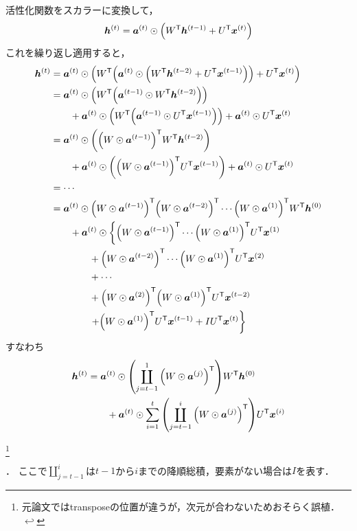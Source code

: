 \documentclass[dvipdfmx,autodetect-engine,12pt,fleqn]{jsarticle}
\newcounter{footnote-anchor}
\newcommand{\footnoteanchor}[1]{
    \hypertarget{footnote-anchor\arabic{footnote-anchor}}{}%
    \footnote{#1 \hyperlink{footnote-anchor\arabic{footnote-anchor}}{$\hookleftarrow$}}%
    \addtocounter{footnote-anchor}{1}
}
\begin{document}
活性化関数をスカラーに変換して，
\begin{equation}
\begin{split}
\bm{h}^{(t)}=\bm{a}^{(t)}\odot\qty(W^{\mathsf{T}} \bm{h}^{(t-1)} + U^{\mathsf{T}}\bm{x}^{(t)})
\end{split}
\end{equation}
これを繰り返し適用すると，
\begin{equation*}
\begin{split}
\bm{h}^{(t)}&=\bm{a}^{(t)}\odot\qty(W^{\mathsf{T}} \qty(\bm{a}^{(t)}\odot\qty(W^{\mathsf{T}} \bm{h}^{(t-2)} + U^{\mathsf{T}}\bm{x}^{(t-1)})) + U^{\mathsf{T}}\bm{x}^{(t)})\\
&=\bm{a}^{(t)}\odot\qty(W^{\mathsf{T}}\qty(\bm{a}^{(t-1)}\odot W^{\mathsf{T}}\bm{h}^{(t-2)}))\\
&\quad\quad +\bm{a}^{(t)}\odot\qty(W^{\mathsf{T}}\qty(\bm{a}^{(t-1)}\odot U^{\mathsf{T}} \bm{x}^{(t-1)}))
+\bm{a}^{(t)}\odot U^{\mathsf{T}}\bm{x}^{(t)}\\
&=\bm{a}^{(t)}\odot\qty(\qty(W \odot \bm{a}^{(t-1)})^{\mathsf{T}} W^{\mathsf{T}}\bm{h}^{(t-2)})\\
&\quad\quad +\bm{a}^{(t)}\odot\qty(\qty(W\odot\bm{a}^{(t-1)})^{\mathsf{T}} U^{\mathsf{T}} \bm{x}^{(t-1)})
+\bm{a}^{(t)}\odot U^{\mathsf{T}}\bm{x}^{(t)}\\
&=\cdots\\
&=\bm{a}^{(t)}\odot\qty(W\odot\bm{a}^{(t-1)})^{\mathsf{T}} \qty(W\odot\bm{a}^{(t-2)})^{\mathsf{T}} \cdots \qty(W\odot\bm{a}^{(1)})^{\mathsf{T}} W^{\mathsf{T}}\bm{h}^{(0)}\\
&\quad\quad+\bm{a}^{(t)}\odot\left\{\qty(W\odot\bm{a}^{(t-1)})^{\mathsf{T}} \cdots \qty(W\odot\bm{a}^{(1)})^{\mathsf{T}} U^{\mathsf{T}}\bm{x}^{(1)} \right.\\
&\quad\quad\quad\quad+\qty(W\odot\bm{a}^{(t-2)})^{\mathsf{T}} \cdots \qty(W\odot\bm{a}^{(1)})^{\mathsf{T}} U^{\mathsf{T}}\bm{x}^{(2)}\\
&\quad\quad\quad\quad+\cdots\\
&\quad\quad\quad\quad+\qty(W\odot\bm{a}^{(2)})^{\mathsf{T}}\qty(W\odot\bm{a}^{(1)})^{\mathsf{T}} U^{\mathsf{T}}\bm{x}^{(t-2)}\\
&\left.\quad\quad\quad\quad+\qty(W\odot\bm{a}^{(1)})^{\mathsf{T}} U^{\mathsf{T}}\bm{x}^{(t-1)}
+IU^{\mathsf{T}}\bm{x}^{(t)}\right\}
\end{split}
\end{equation*}
すなわち
\begin{equation}
\begin{split}
\bm{h}^{(t)}&=\bm{a}^{(t)}\odot\qty(\coprod_{j=t-1}^1\qty(W\odot\bm{a}^{(j)})^{\mathsf{T}})W^{\mathsf{T}}\bm{h}^{(0)}\\
&\quad\quad+\bm{a}^{(t)}\odot\sum_{i=1}^t\qty(\coprod_{j=t-1}^i\qty(W\odot\bm{a}^{(j)})^{\mathsf{T}}) U^{\mathsf{T}}\bm{x}^{(i)}
\end{split}
\end{equation}
\footnoteanchor{元論文ではtransposeの位置が違うが，次元が合わないためおそらく誤植．}．
ここで$\coprod_{j=t-1}^i$は$t-1$から$i$までの降順総積，要素がない場合は$I$を表す．
\end{document}

